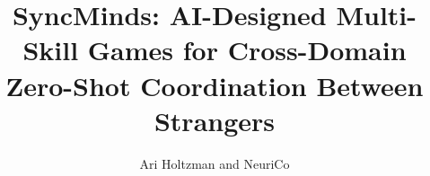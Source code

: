 \documentclass{article}
\title{SyncMinds: AI-Designed Multi-Skill Games for Cross-Domain\\Zero-Shot Coordination Between Strangers}
\author{Ari Holtzman and NeuriCo}
\begin{document}
\maketitle

\begin{abstract}

\end{abstract}










\end{document}
